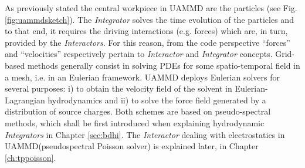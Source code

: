 \documentclass[twoside,openright,titlepage,numbers=noenddot,%
headinclude,footinclude,cleardoublepage=empty,abstract=on,
BCOR=5mm,fontsize=11pt, dvipsnames, paper=b5
]{scrreprt}
\newcommand{\uammd}{\gls{UAMMD}\xspace}
\begin{document}
As previously stated the central workpiece in \uammd are the particles (see Fig. \ref{fig:uammdsketch}). The \emph{Integrator} solves the time evolution of the particles and to that end, it requires the driving interactions (e.g. forces) which are, in turn, provided by the \emph{Interactors}. For this reason, from the code perspective ``forces'' and ``velocities'' respectively pertain to \emph{Interactor} and \emph{Integrator} concepts. Grid-based methods generally consist in solving \glspl{PDE} for some spatio-temporal field in a mesh, i.e. in an Eulerian framework. \uammd deploys Eulerian solvers for several purposes: i) to obtain the velocity field of the solvent in Eulerian-Lagrangian hydrodynamics and ii) to solve the force field generated by a distribution of source charges. Both schemes are based on pseudo-spectral methods, which shall be first introduced when explaining hydrodynamic \emph{Integrators} in Chapter \ref{sec:bdhi}. The \emph{Interactor} dealing with electrostatics in \uammd (pseudospectral Poisson solver) is explained later, in Chapter \ref{ch:tppoisson}.
\end{document}
